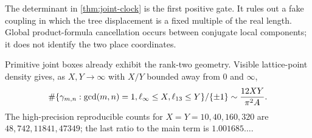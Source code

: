 \begin{remark}
The determinant in \cref{thm:joint-clock} is the first positive gate.  It
rules out a fake coupling in which the tree displacement is a fixed multiple
of the real length.  Global product-formula cancellation occurs between
conjugate local components; it does not identify the two place coordinates.
\end{remark}

Primitive joint boxes already exhibit the rank-two geometry.  Visible
lattice-point density gives, as $X,Y\to\infty$ with $X/Y$ bounded away from
$0$ and $\infty$,
\begin{equation}\label{eq:box-count}
\#\{\gamma_{m,n}:\gcd(m,n)=1,
\ell_{\infty}\le X,\ell_{13}\le Y\}/\{\pm1\}
\sim\frac{12XY}{\pi^2A}.
\end{equation}
The high-precision reproducible counts for $X=Y=10,40,160,320$ are
$48,742,11841,47349$; the last ratio to the main term is
$1.001685\ldots$.

